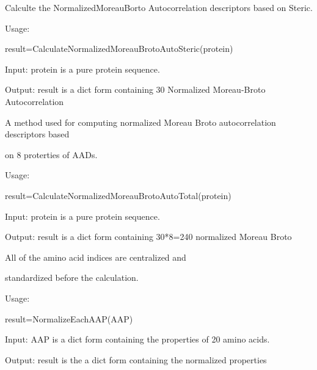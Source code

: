 \documentclass[letterpaper,10pt,english]{sphinxmanual}
\begin{document}

\begin{fulllineitems}
\label{reference/Autocorrelation:Autocorrelation.CalculateNormalizedMoreauBrotoAutoSteric}
Calculte the NormalizedMoreauBorto Autocorrelation descriptors based on Steric.

Usage:

result=CalculateNormalizedMoreauBrotoAutoSteric(protein)

Input: protein is a pure protein sequence.

Output: result is a dict form containing 30 Normalized Moreau-Broto Autocorrelation

\end{fulllineitems}


\begin{fulllineitems}
\label{reference/Autocorrelation:Autocorrelation.CalculateNormalizedMoreauBrotoAutoTotal}
A method used for computing normalized Moreau Broto autocorrelation descriptors based

on 8 proterties of AADs.

Usage:

result=CalculateNormalizedMoreauBrotoAutoTotal(protein)

Input: protein is a pure protein sequence.

Output: result is a dict form containing 30*8=240 normalized Moreau Broto

\end{fulllineitems}


\begin{fulllineitems}
\label{reference/Autocorrelation:Autocorrelation.NormalizeEachAAP}
All of the amino acid indices are centralized and

standardized before the calculation.

Usage:

result=NormalizeEachAAP(AAP)

Input: AAP is a dict form containing the properties of 20 amino acids.

Output: result is the a dict form containing the normalized properties

\end{fulllineitems}
\end{document}
